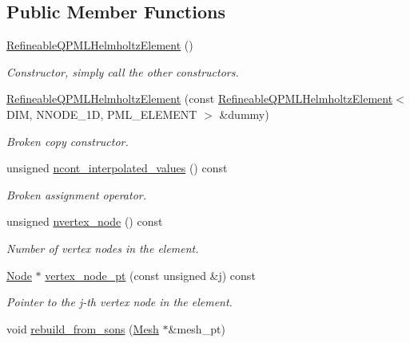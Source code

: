 \subsection*{Public Member Functions}
\begin{DoxyCompactItemize}
\item 
\hyperlink{classoomph_1_1RefineableQPMLHelmholtzElement_a1874e16af4b8c3cf044268810e886fa8}{Refineable\+Q\+P\+M\+L\+Helmholtz\+Element} ()
\begin{DoxyCompactList}\small\item\em Constructor, simply call the other constructors. \end{DoxyCompactList}\item 
\hyperlink{classoomph_1_1RefineableQPMLHelmholtzElement_a1276237359e84c80f372f0144bd8d672}{Refineable\+Q\+P\+M\+L\+Helmholtz\+Element} (const \hyperlink{classoomph_1_1RefineableQPMLHelmholtzElement}{Refineable\+Q\+P\+M\+L\+Helmholtz\+Element}$<$ D\+IM, N\+N\+O\+D\+E\+\_\+1D, P\+M\+L\+\_\+\+E\+L\+E\+M\+E\+NT $>$ \&dummy)
\begin{DoxyCompactList}\small\item\em Broken copy constructor. \end{DoxyCompactList}\item 
unsigned \hyperlink{classoomph_1_1RefineableQPMLHelmholtzElement_a27c58bf38a4229ef81ba7f7e8d41da07}{ncont\+\_\+interpolated\+\_\+values} () const
\begin{DoxyCompactList}\small\item\em Broken assignment operator. \end{DoxyCompactList}\item 
unsigned \hyperlink{classoomph_1_1RefineableQPMLHelmholtzElement_abaa7c8665be12c2be2eb14f17c5feef8}{nvertex\+\_\+node} () const
\begin{DoxyCompactList}\small\item\em Number of vertex nodes in the element. \end{DoxyCompactList}\item 
\hyperlink{classoomph_1_1Node}{Node} $\ast$ \hyperlink{classoomph_1_1RefineableQPMLHelmholtzElement_a267cb4f80eb5d48ac55dcc5b9f38dafe}{vertex\+\_\+node\+\_\+pt} (const unsigned \&j) const
\begin{DoxyCompactList}\small\item\em Pointer to the j-\/th vertex node in the element. \end{DoxyCompactList}\item 
void \hyperlink{classoomph_1_1RefineableQPMLHelmholtzElement_a27b1fabd3fcd677628035f2a8e2175f7}{rebuild\+\_\+from\+\_\+sons} (\hyperlink{classoomph_1_1Mesh}{Mesh} $\ast$\&mesh\+\_\+pt)

\end{DoxyCompactItemize}
